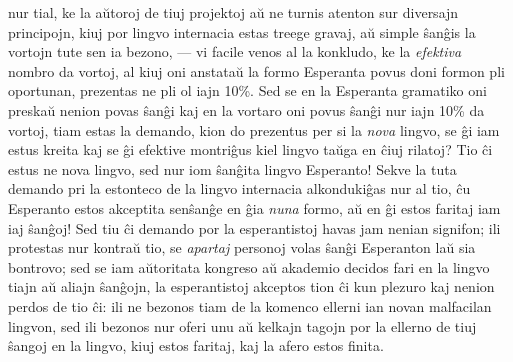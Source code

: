 nur tial, ke la a\u utoroj de tiuj projektoj a\u u ne turnis atenton
sur diversajn principojn, kiuj por lingvo internacia estas treege
gravaj, a\u u simple \^san\^gis la vortojn tute sen ia bezono, ---
vi facile venos al la konkludo, ke la {\sl efektiva} nombro da
vortoj, al kiuj oni anstata\u u la formo Esperanta povus doni formon
pli oportunan, prezentas ne pli ol
iajn 10\%. Sed se en la Esperanta gramatiko oni preska\u u nenion povas
\^san\^gi kaj en la vortaro oni povus \^san\^gi nur iajn 10\% da vortoj,
tiam estas la demando, kion do prezentus per si la {\sl nova}
lingvo, se \^gi iam estus kreita kaj se \^gi efektive montri\^gus
kiel lingvo ta\u uga en \^ciuj rilatoj? Tio \^ci estus ne nova
lingvo, sed nur iom \^san\^gita lingvo Esperanto! Sekve la tuta
demando pri la estonteco de la lingvo internacia alkonduki\^gas nur
al tio, \^cu Esperanto estos akceptita sen\^san\^ge en \^gia {\sl
nuna} formo, a\u u en \^gi estos faritaj iam iaj \^san\^goj! Sed tiu
\^ci demando por la esperantistoj havas jam nenian signifon; ili
protestas nur kontra\u u tio, se {\sl apartaj} personoj volas
\^san\^gi Esperanton la\u u sia bontrovo; sed se iam a\u utoritata
kongreso a\u u akademio decidos fari en la lingvo tiajn a\u u aliajn
\^san\^gojn, la esperantistoj akceptos tion \^ci kun plezuro kaj
nenion perdos de tio \^ci: ili ne bezonos tiam de la komenco ellerni
ian novan malfacilan lingvon, sed ili bezonos nur oferi unu a\u u
kelkajn tagojn por la ellerno de tiuj \^sangoj en la lingvo, kiuj
estos faritaj, kaj la afero estos finita.

